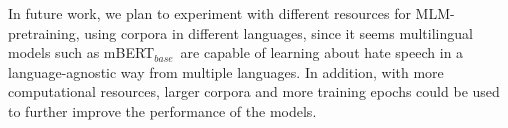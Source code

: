 \documentclass[11pt]{article}
\newcommand{\mbert}{\mbox{mBERT$_{base}$}}
\begin{document}
In future work, we plan to experiment with different resources for MLM-pretraining, using corpora in different languages, since it seems multilingual models such as \mbert\, are capable of learning about hate speech in a language-agnostic way from multiple languages. In addition, with more computational resources, larger corpora and more training epochs could be used to further improve the performance of the models.







\end{document}
